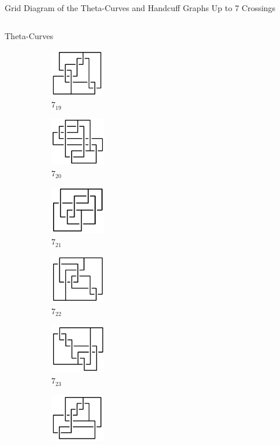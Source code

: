 \documentclass[final]{beamer}
\begin{document}
\begin{frame}[t]
\begin{alertblock}{Grid Diagram of the Theta-Curves and Handcuff Graphs Up to 7 Crossings}
\begin{columns}[t]
\begin{column}{0.6\textwidth}
\begin{alertblock}{Theta-Curves}
\begin{figure}
\begin{subfigure}{0.075\textwidth}
    \includegraphics[width=2.4cm]{../Midterm_Poster/grid_diagram/theta_7_19.png}
    \caption{$7_{19}$} 
    \end{subfigure}
    \begin{subfigure}{0.075\textwidth}
    \includegraphics[width=2.4cm]{../Midterm_Poster/grid_diagram/theta_7_20.png}
    \caption{$7_{20}$} 
    \end{subfigure}
    \begin{subfigure}{0.075\textwidth}
    \includegraphics[width=2.4cm]{../Midterm_Poster/grid_diagram/theta_7_21.png}
    \caption{$7_{21}$} 
    \end{subfigure}
    \begin{subfigure}{0.075\textwidth}
    \includegraphics[width=2.4cm]{../Midterm_Poster/grid_diagram/theta_7_22.png}
    \caption{$7_{22}$} 
    \end{subfigure}
    \begin{subfigure}{0.075\textwidth}
    \includegraphics[width=2.4cm]{../Midterm_Poster/grid_diagram/theta_7_23.png}
    \caption{$7_{23}$} 
    \end{subfigure}
    \begin{subfigure}{0.075\textwidth}
    \includegraphics[width=2.4cm]{../Midterm_Poster/grid_diagram/theta_7_24.png}

\end{subfigure}
\end{figure}
\end{alertblock}
\end{column}
\end{columns}
\end{alertblock}
\end{frame}
\end{document}
